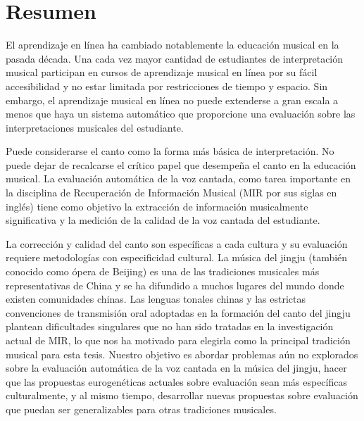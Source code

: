%
%
\chapter{Resumen}
\vspace*{-1cm}
El aprendizaje en línea ha cambiado notablemente la educación musical en la pasada década. Una cada vez mayor cantidad de estudiantes de interpretación musical participan en cursos de aprendizaje musical en línea por su fácil accesibilidad y no estar limitada por restricciones de tiempo y espacio. Sin embargo, el aprendizaje musical en línea no puede extenderse a gran escala a menos que haya un sistema automático que proporcione una evaluación sobre las interpretaciones musicales del estudiante.

Puede considerarse el canto como la forma más básica de interpretación. No puede dejar de recalcarse el crítico papel que desempeña el canto en la educación musical. La evaluación automática de la voz cantada, como tarea importante en la disciplina de Recuperación de Información Musical (MIR por sus siglas en inglés) tiene como objetivo la extracción de información musicalmente significativa y la medición de la calidad de la voz cantada del estudiante.

La corrección y calidad del canto son específicas a cada cultura y su evaluación requiere metodologías con especificidad cultural. La música del jingju (también conocido como ópera de Beijing) es una de las tradiciones musicales más representativas de China y se ha difundido a muchos lugares del mundo donde existen comunidades chinas. Las lenguas tonales chinas y las estrictas convenciones de transmisión oral adoptadas en la formación del canto del jingju plantean dificultades singulares que no han sido tratadas en la investigación actual de MIR, lo que nos ha motivado para elegirla como la principal tradición musical para esta tesis. Nuestro objetivo es abordar problemas aún no explorados sobre la evaluación automática de la voz cantada en la música del jingju, hacer que las propuestas eurogenéticas actuales sobre evaluación sean más específicas culturalmente, y al mismo tiempo, desarrollar nuevas propuestas sobre evaluación que puedan ser generalizables para otras tradiciones musicales.

